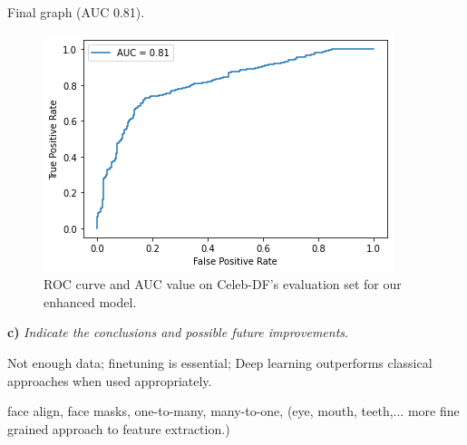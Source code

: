 \documentclass[11pt]{article}
\begin{document}
Final graph (AUC 0.81).

\begin{figure}[h!]
  \centering
  \includegraphics[width=.6\textwidth]{img/3-finetune-roc-celeb}
  \caption{ROC curve and AUC value on Celeb-DF's evaluation set for our enhanced model.}
  \label{fig:t3}
\end{figure}

\textbf{c)} \textit{Indicate the conclusions and possible future improvements}.

Not enough data; finetuning is essential; Deep learning outperforms classical approaches when used appropriately.

face align, face masks, one-to-many, many-to-one, (eye, mouth, teeth,... more fine grained approach to feature extraction.)




\end{document}
